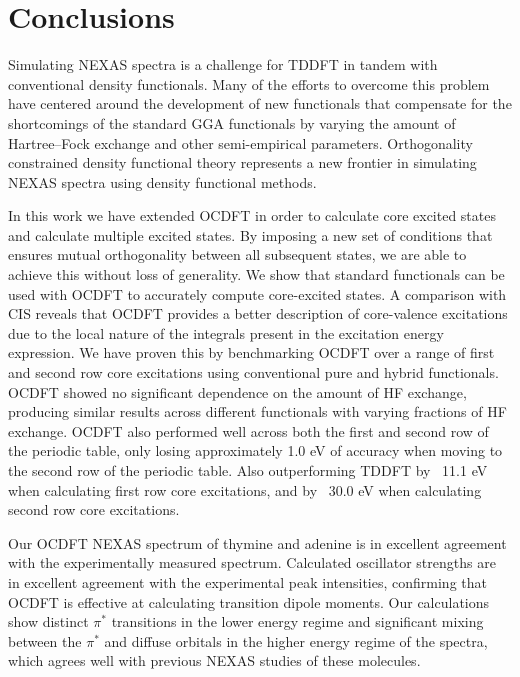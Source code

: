 \documentclass[12pt]{article}
\begin{document}
\section{Conclusions}
Simulating NEXAS spectra is a challenge for TDDFT in tandem with conventional density functionals. Many of the efforts to overcome this problem have centered around the development of new functionals that compensate for the shortcomings of the standard GGA functionals by varying the amount of Hartree--Fock exchange and other semi-empirical parameters.
Orthogonality constrained density functional theory represents a new frontier in simulating NEXAS spectra using density functional methods.

In this work we have extended OCDFT in order to calculate core excited states and calculate multiple excited states. By imposing a new set of conditions that ensures mutual orthogonality between all subsequent states, we are able to achieve this without loss of generality. We show that standard functionals can be used with OCDFT to accurately compute core-excited states. A comparison with CIS reveals  that OCDFT provides a better description of core-valence excitations due to the local nature of the integrals present in the excitation energy expression. We have proven this by benchmarking OCDFT over a range of first and second row core excitations using conventional pure and hybrid functionals. OCDFT showed no significant dependence on the amount of HF exchange, producing similar results across different functionals with varying fractions of HF exchange. OCDFT also performed well across both the first and second row of the periodic table, only losing approximately 1.0 eV of accuracy when moving to the second row of the periodic table. Also outperforming TDDFT by ~11.1 eV when calculating first row core excitations, and by ~30.0 eV when calculating second row core excitations.

Our OCDFT NEXAS spectrum of thymine and adenine is in excellent agreement with the experimentally measured spectrum. Calculated oscillator strengths are in excellent agreement with the experimental peak intensities, confirming that OCDFT is effective at calculating transition dipole moments. Our calculations show distinct $\pi^*$ transitions in the lower energy regime and significant mixing between the $\pi^*$ and diffuse orbitals in the higher energy regime of the spectra, which agrees well with previous NEXAS studies of these molecules.\cite{plekan_theoretical_2008,wenzel_calculating_2014}
\end{document}
